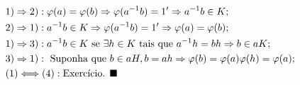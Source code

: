 \documentclass[Algebra/algebra_notes.tex]{subfiles}
\begin{document}
\begin{proof*}
	\begin{align*}
		 & 1)\Rightarrow2): \varphi(a) = \varphi(b) \Rightarrow \varphi(a^{-1}b) = 1' \Rightarrow a^{-1}b\in K;             \\
		 & 2)\Rightarrow1): a^{-1}b\in K \Rightarrow \varphi(a^{-1}b) = 1' \Rightarrow \varphi(a)=\varphi(b);               \\
		 & 1)\Rightarrow3): a^{-1}b\in K \text{ se } \exists h\in K \text{ tais que } a^{-1}h = bh \Rightarrow b\in aK;     \\
		 & 3)\Rightarrow1): \text{ Suponha que }b\in aH, b = ah \Rightarrow \varphi(b) = \varphi(a)\varphi(h) = \varphi(a); \\
		 & (1)\Longleftrightarrow(4): \text{Exercício. $\blacksquare$}
	\end{align*}
\end{proof*}
\end{document}
